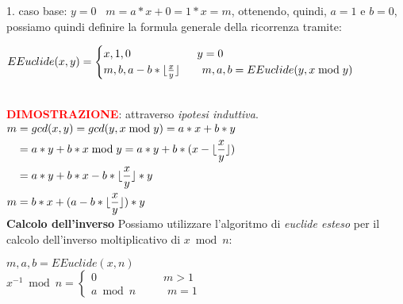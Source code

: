 1. caso base: $y = 0\;\;\; m = a * x + 0 = 1 * x = m$, ottenendo, quindi, $a = 1$ e $b = 0$, possiamo quindi definire la formula generale della ricorrenza tramite:
\begin{center}
    \begin{math}
        EEuclide(x, y) =
        \begin{cases}
            x, 1, 0 \qquad \qquad \qquad y = 0 \\
            m, b, a - b * \lfloor\frac{x}{y}\rfloor \qquad m, a, b = EEuclide(y, x \bmod y)
        \end{cases}
    \end{math}
\end{center}
\   \\ \newline
\textcolor{red}{\textbf{DIMOSTRAZIONE}}: attraverso \textit{ipotesi induttiva}.
\\ \newline
\begin{math}
    \begin{aligned}
        m& = gcd(x, y) = gcd(y, x \bmod y) = a * x + b * y \\
        & = a * y + b * x \bmod y = a * y + b * (x - \lfloor\frac{x}{y}\rfloor) \\
        & = a * y + b * x - b * \lfloor\frac{x}{y}\rfloor * y \\
        m& = b * x + (a - b * \lfloor\frac{x}{y}\rfloor) * y
    \end{aligned}
\end{math}
\   \\ \newline
\textbf{Calcolo dell'inverso}
\newline
Possiamo utilizzare l'algoritmo di \textit{euclide esteso} per il calcolo dell'inverso moltiplicativo di $x \bmod n$:
\begin{center}
    $m, a, b = EEuclide(x, n)$ \\
    \begin{math}
        x ^ {-1} \bmod n =
        \begin{cases}
            0 \qquad \qquad \qquad m > 1 \\
            a \bmod n \qquad\;\;\; m = 1
        \end{cases}
    \end{math}
\end{center}

